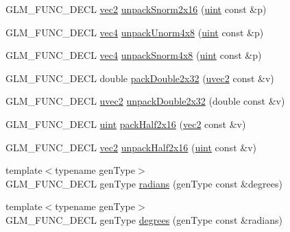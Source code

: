 \begin{CompactItemize}
\item 
GLM\_\-FUNC\_\-DECL \hyperlink{group__core__types_ga1618f51db67eaa145db101d8c8431d8}{vec2} \hyperlink{group__core__func__packing_ga3f9bd6a71d7bdfab090b9626f2466aa}{unpackSnorm2x16} (\hyperlink{group__core__precision_g4fd29415871152bfb5abd588334147c8}{uint} const \&p)
\item 
GLM\_\-FUNC\_\-DECL \hyperlink{group__core__types_g5881b1b022d7fd1b7218f5916532dd02}{vec4} \hyperlink{group__core__func__packing_g5d3c4d354b48a317935349dd62a8b8a5}{unpackUnorm4x8} (\hyperlink{group__core__precision_g4fd29415871152bfb5abd588334147c8}{uint} const \&p)
\item 
GLM\_\-FUNC\_\-DECL \hyperlink{group__core__types_g5881b1b022d7fd1b7218f5916532dd02}{vec4} \hyperlink{group__core__func__packing_g126a0deffef1f2d10dd67237981a870b}{unpackSnorm4x8} (\hyperlink{group__core__precision_g4fd29415871152bfb5abd588334147c8}{uint} const \&p)
\item 
GLM\_\-FUNC\_\-DECL double \hyperlink{group__core__func__packing_gf728fdfb98ce34da6f968d9f6bf154d7}{packDouble2x32} (\hyperlink{group__core__types_gfd2041b45eff671aa8899d2c2835eee9}{uvec2} const \&v)
\item 
GLM\_\-FUNC\_\-DECL \hyperlink{group__core__types_gfd2041b45eff671aa8899d2c2835eee9}{uvec2} \hyperlink{group__core__func__packing_g7e8cf88c278c18969c99af83bceed024}{unpackDouble2x32} (double const \&v)
\item 
GLM\_\-FUNC\_\-DECL \hyperlink{group__core__precision_g4fd29415871152bfb5abd588334147c8}{uint} \hyperlink{group__core__func__packing_g082f6dd65f73a547ed3067ef00be036f}{packHalf2x16} (\hyperlink{group__core__types_ga1618f51db67eaa145db101d8c8431d8}{vec2} const \&v)
\item 
GLM\_\-FUNC\_\-DECL \hyperlink{group__core__types_ga1618f51db67eaa145db101d8c8431d8}{vec2} \hyperlink{group__core__func__packing_g4051804cc2c930ba4ca73382b79edf1d}{unpackHalf2x16} (\hyperlink{group__core__precision_g4fd29415871152bfb5abd588334147c8}{uint} const \&v)
\item 
{\footnotesize template$<$typename genType$>$ }\\GLM\_\-FUNC\_\-DECL genType \hyperlink{group__core__func__trigonometric_g87953103f3ac701b8440a7d904fa2e4d}{radians} (genType const \&degrees)
\item 
{\footnotesize template$<$typename genType$>$ }\\GLM\_\-FUNC\_\-DECL genType \hyperlink{group__core__func__trigonometric_gcb63bdf23d5e084a5b6a2ed0ae395e64}{degrees} (genType const \&radians)

\end{CompactItemize}
